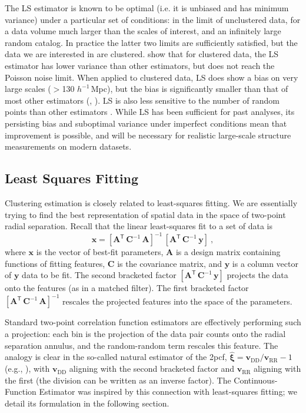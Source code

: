 \documentclass[modern]{aastex62}
\newcommand{\cf}{2pcf\xspace}
\newcommand{\Est}{The Continuous-Function Estimator\xspace}
\newcommand{\LS}{LS\xspace}
\newcommand{\inv}{^{-1}}
\newcommand{\T}{^{\mathsf{T}}}
\newcommand{\hmpc}{$h^{-1}\,$Mpc}
\newcommand{\bld}[1]{\bm{#1}}
\newcommand{\vv}[1]{\bld{v}_\mathrm{#1}}
\begin{document}
The \LS estimator is known to be optimal (i.e. it is unbiased and has minimum variance) under a particular set of conditions: in the limit of unclustered data, for a data volume much larger than the scales of interest, and an infinitely large random catalog. 
In practice the latter two limits are sufficiently satisfied, but the data we are interested in are clustered.
\cite{VargasMagana2013} show that for clustered data, the \LS estimator has lower variance than other estimators, but does not reach the Poisson noise limit.
When applied to clustered data, \LS does show a bias on very large scales ($>$130 \hmpc), but the bias is significantly smaller than that of most other estimators (\citealt{Kerscher1999}, \citealt{VargasMagana2013}).
\LS is also less sensitive to the number of random points than other estimators \citep{Kerscher2000}.
While \LS has been sufficient for past analyses, its persisting bias and suboptimal variance under imperfect conditions mean that improvement is possible, and will be necessary for realistic large-scale structure measurements on modern datasets.

\subsection{Least Squares Fitting}

Clustering estimation is closely related to least-squares fitting.
We are essentially trying to find the best representation of spatial data in the space of two-point radial separation.
Recall that the linear least-squares fit to a set of data is
\begin{equation}
    \label{eq:leastsq}
    \bld{x} = [\bld{A}\T\,\bld{C}\inv\,\bld{A}]\inv \, [\bld{A}\T\,\bld{C}\inv\,\bld{y}] ~,
\end{equation}
where $\bld{x}$ is the vector of best-fit parameters, $\bld{A}$ is a design matrix containing functions of fitting features, $\bld{C}$ is the covariance matrix, and $\bld{y}$ is a column vector of $\bld{y}$ data to be fit.
The second bracketed factor $[\bld{A}\T\,\bld{C}\inv\,\bld{y}]$ projects the data onto the features (as in a matched filter). 
The first bracketed factor $[\bld{A}\T\,\bld{C}\inv\,\bld{A}]\inv$ rescales the projected features into the space of the parameters.

Standard two-point correlation function estimators are effectively performing such a projection: each bin is the projection of the data pair counts onto the radial separation annulus, and the random-random term rescales this feature.
The analogy is clear in the so-called natural estimator of the \cf, $\bld{\hat{\xi}} = \vv{DD}/\vv{RR} - 1$ (e.g., \citealt{Kerscher2000}), with $\vv{DD}$ aligning with the second bracketed factor and $\vv{RR}$ aligning with the first (the division can be written as an inverse factor).
\Est was inspired by this connection with least-squares fitting; we detail its formulation in the following section.
\end{document}
